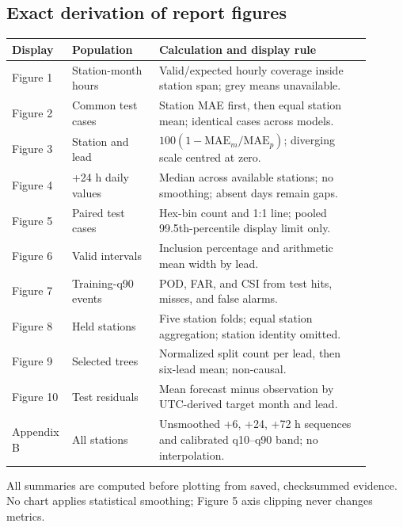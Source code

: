 \documentclass[11pt,a4paper]{article}
\begin{document}
\subsection{Exact derivation of report figures}
\begin{longtable}{p{0.10\linewidth}p{0.23\linewidth}p{0.57\linewidth}}
\toprule Display & Population & Calculation and display rule \\
\midrule\endhead
Figure 1 & Station-month hours & Valid/expected hourly coverage inside station span; grey means unavailable. \\
Figure 2 & Common test cases & Station MAE first, then equal station mean; identical cases across models. \\
Figure 3 & Station and lead & $100(1-\mathrm{MAE}_m/\mathrm{MAE}_p)$; diverging scale centred at zero. \\
Figure 4 & +24 h daily values & Median across available stations; no smoothing; absent days remain gaps. \\
Figure 5 & Paired test cases & Hex-bin count and 1:1 line; pooled 99.5th-percentile display limit only. \\
Figure 6 & Valid intervals & Inclusion percentage and arithmetic mean width by lead. \\
Figure 7 & Training-q90 events & POD, FAR, and CSI from test hits, misses, and false alarms. \\
Figure 8 & Held stations & Five station folds; equal station aggregation; station identity omitted. \\
Figure 9 & Selected trees & Normalized split count per lead, then six-lead mean; non-causal. \\
Figure 10 & Test residuals & Mean forecast minus observation by UTC-derived target month and lead. \\
Appendix B & All stations & Unsmoothed +6, +24, +72 h sequences and calibrated q10--q90 band; no interpolation. \\
\bottomrule
\end{longtable}
All summaries are computed before plotting from saved, checksummed evidence. No chart applies statistical smoothing; Figure 5 axis clipping never changes metrics.
\end{document}
